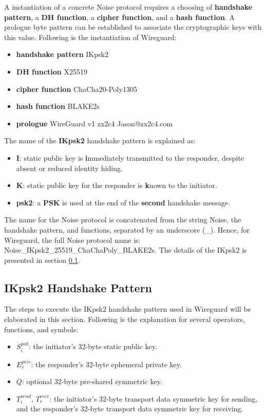 A instantiation of a concrete Noise protocol requires a choosing of \textbf{handshake pattern}, a
\textbf{DH function}, a \textbf{cipher function}, and a \textbf{hash function}. A prologue byte pattern 
can be established to associate the cryptographic keys with this value. Following is the instantiation
of Wireguard:
\begin{itemize}
  \item \textbf{handshake pattern}  IKpsk2
  \item \textbf{DH function} X25519
  \item \textbf{cipher function} ChaCha20-Poly1305
  \item \textbf{hash function} BLAKE2s
  \item \textbf{prologue} WireGuard v1 zx2c4 Jason@zx2c4.com
\end{itemize}

The name of the \textbf{IKpsk2} handshake pattern is explained as:
\begin{itemize}
  \item \textbf{I}: static public key is \textbf{i}mmediately transmitted to the
  responder, despite absent or reduced identity hiding.
  \item \textbf{K}: static public key for the responder is \textbf{k}nown to the initiator.
  \item \textbf{psk2}: a \textbf{PSK} is used at the end of the \textbf{second} handshake message.
\end{itemize}

The name for the Noise protocol is concatenated from the string Noise, the
handshake pattern, and functions, separated by an underscore ({\_}). Hence, for Wireguard,
the full Noise protocol name is:  Noise{\_}IKpsk2{\_}25519{\_}ChaChaPoly{\_}BLAKE2s.
The details of the IKpsk2 is presented in section \ref{ikpsk2}.

\subsection{IKpsk2 Handshake Pattern} \label{ikpsk2}
  The steps to execute the IKpsk2 handshake pattern used in Wireguard will be elaborated in this
  section. Following is the explanation for several operators, functions, and symbols:
    \begin{itemize}
      \item $S^{pub}_i$: the initiator's 32-byte static public key.
      \item $E^{priv}_r$: the responder's 32-byte ephemeral private key.
      \item $Q$: optional 32-byte pre-shared symmetric key.
      \item $T^{send}_i$, $T^{recv}_r$: the initiator's 32-byte transport data symmetric key for sending,
      and the responder's 32-byte transport data symmetric key for receiving.
    \end{itemize}

